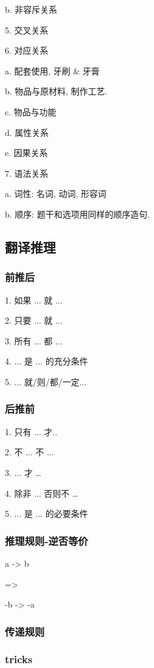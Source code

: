 \documentclass[UTF8]{ctexart}
\begin{document}
b. 非容斥关系

5. 交叉关系

6. 对应关系

a. 配套使用, 牙刷 \& 牙膏

b. 物品与原材料, 制作工艺.

c. 物品与功能

d. 属性关系

e. 因果关系

7. 语法关系

a. 词性: 名词, 动词, 形容词

b. 顺序: 题干和选项用同样的顺序造句.

\subsection{翻译推理}

\subsubsection{前推后}
1. 如果 ... 就 ...

2. 只要 ... 就 ...

3. 所有 ... 都 ...

4. ... 是 ... 的充分条件

5. ... 就/则/都/一定...

\subsubsection{后推前}

1. 只有 ... 才..

2. 不 ... 不 ...

3. ... 才 \dots

4. 除非 ... 否则不 \dots

5. ... 是 ... 的必要条件

\subsubsection{推理规则-逆否等价}

a -> b

=>

-b -> -a

\subsubsection{传递规则}

\subsubsection{tricks}
\end{document}
